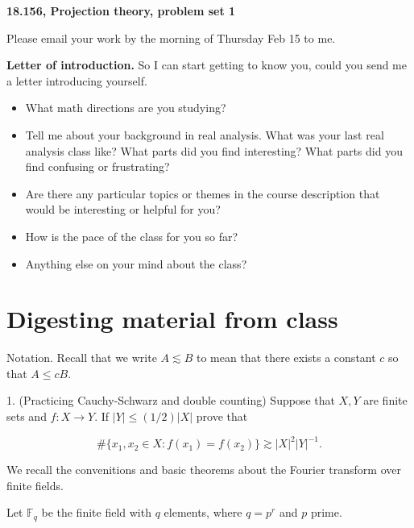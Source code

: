 \documentclass{amsart}
\newcommand{\FF}{\mathbb{F}}
\begin{document}
{\bf  18.156, Projection theory,  problem set 1}



\vskip10pt

Please email your work by the morning of Thursday Feb 15 to me.

\vskip10pt

{\bf Letter of introduction.}  So I can start getting to know you, could you send me a letter introducing yourself.   

\begin{itemize}

\item  What math directions are you studying?

\item Tell me about your background in real analysis.  What was your last real analysis class like?  What parts did you find interesting?  What parts did you find confusing or frustrating?

\item Are there any particular topics or themes in the course description that would be interesting or helpful for you?

\item How is the pace of the class for you so far?  

\item Anything else on your mind about the class?

\end{itemize}

\section{Digesting material from class}

Notation.   Recall that we write $A \lesssim B$ to mean that there exists a constant $c$ so that $A \le c B$.

\vskip10pt


1.  (Practicing Cauchy-Schwarz and double counting)   Suppose that $X, Y$ are finite sets and $f: X \rightarrow Y$.   If $|Y| \le (1/2) |X|$ prove that

$$ \# \{ x_1, x_2 \in X: f(x_1) = f(x_2) \} \gtrsim |X|^2 |Y|^{-1}. $$

\vskip10pt

We recall the convenitions and basic theorems about the Fourier transform over finite fields.

\vskip10pt

Let $\FF_q$ be the finite field with $q$ elements,  where $q = p^r$ and $p$ prime. 
\end{document}
